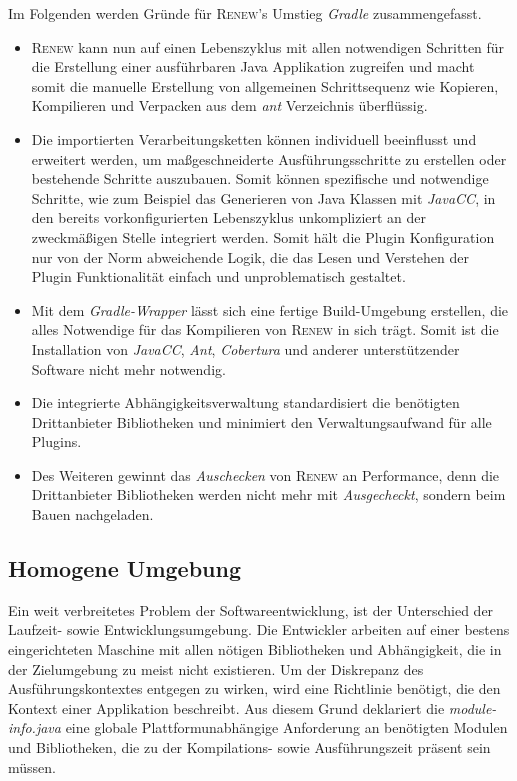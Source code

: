 		Im Folgenden werden Gründe für \textsc{Renew}'s Umstieg \textit{Gradle} zusammengefasst.\bigbreak
		\begin{itemize}
			\item \textsc{Renew} kann nun auf einen Lebenszyklus mit allen notwendigen Schritten für die Erstellung einer ausführbaren Java Applikation zugreifen und macht somit die manuelle Erstellung von allgemeinen Schrittsequenz wie Kopieren, Kompilieren und Verpacken aus dem \textit{ant} Verzeichnis überflüssig. 
			\item Die importierten Verarbeitungsketten können individuell beeinflusst und erweitert werden, um maßgeschneiderte Ausführungsschritte zu erstellen oder bestehende Schritte auszubauen. Somit können spezifische und notwendige Schritte, wie zum Beispiel das Generieren von Java Klassen mit \textit{JavaCC}, in den bereits vorkonfigurierten Lebenszyklus unkompliziert an der zweckmäßigen Stelle integriert werden. Somit hält die Plugin Konfiguration nur von der Norm abweichende Logik, die das Lesen und Verstehen der Plugin Funktionalität einfach und unproblematisch gestaltet. 
			\item Mit dem \textit{Gradle-Wrapper} lässt sich eine fertige Build-Umgebung erstellen, die alles Notwendige für das Kompilieren von \textsc{Renew} in sich trägt. Somit ist die Installation von \textit{JavaCC}, \textit{Ant}, \textit{Cobertura} und anderer unterstützender Software nicht mehr notwendig.
			\item Die integrierte Abhängigkeitsverwaltung standardisiert die benötigten Drittanbieter Bibliotheken und minimiert den Verwaltungsaufwand für alle Plugins. 
			\item Des Weiteren gewinnt das \textit{Auschecken} von \textsc{Renew} an Performance, denn die Drittanbieter Bibliotheken werden nicht mehr mit \textit{Ausgecheckt}, sondern beim Bauen nachgeladen.
		\end{itemize}
	\subsection{Homogene Umgebung} %
		Ein weit verbreitetes Problem der Softwareentwicklung, ist der Unterschied der Laufzeit- sowie Entwicklungsumgebung. Die Entwickler arbeiten auf einer bestens eingerichteten Maschine mit allen nötigen Bibliotheken und Abhängigkeit, die in der Zielumgebung zu meist nicht existieren. Um der Diskrepanz des Ausführungskontextes entgegen zu wirken, wird eine Richtlinie benötigt, die den Kontext einer Applikation beschreibt. Aus diesem Grund deklariert die \textit{module-info.java} eine globale Plattformunabhängige Anforderung an benötigten Modulen und Bibliotheken, die zu der Kompilations- sowie Ausführungszeit präsent sein müssen.\bigbreak

